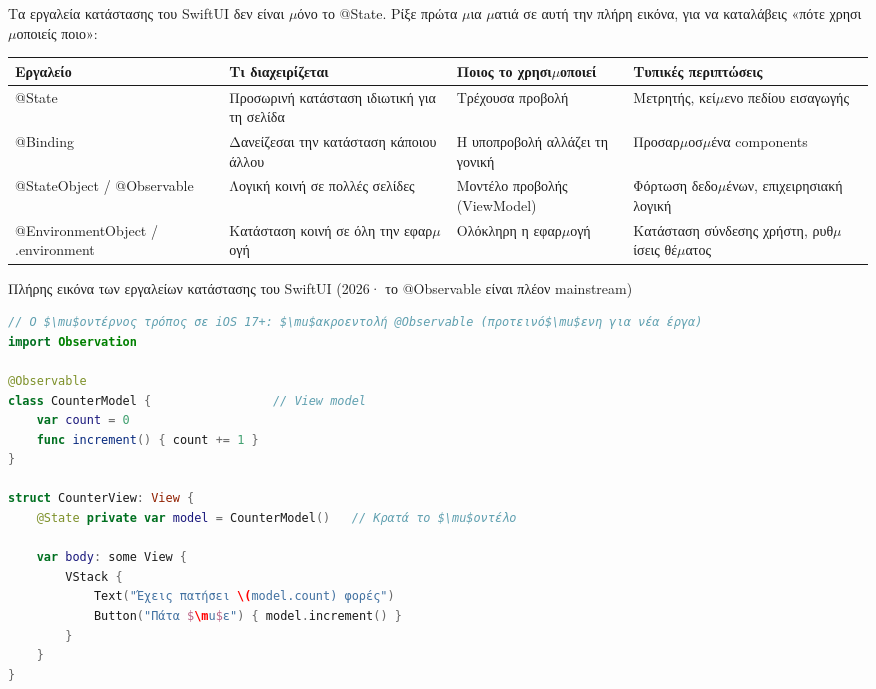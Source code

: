 


Τα εργαλεία κατάστασης του SwiftUI δεν είναι $\mu$όνο το @State. Ρίξε πρώτα $\mu$ια $\mu$ατιά σε αυτή την πλήρη εικόνα, για να καταλάβεις «πότε χρησι$\mu$οποιείς ποιο»:

\begin{center}
\begin{tabularx}{\linewidth}{|X|X|X|X|}
\hline
\textbf{Εργαλείο} & \textbf{Τι διαχειρίζεται} & \textbf{Ποιος το χρησι$\mu$οποιεί} & \textbf{Τυπικές περιπτώσεις} \tabularnewline
\hline
@State & Προσωρινή κατάσταση ιδιωτική για τη σελίδα & Τρέχουσα προβολή & Μετρητής, κεί$\mu$ενο πεδίου εισαγωγής \tabularnewline
@Binding & Δανείζεσαι την κατάσταση κάποιου άλλου & Η υποπροβολή αλλάζει τη γονική & Προσαρ$\mu$οσ$\mu$ένα components \tabularnewline
@StateObject / @Observable & Λογική κοινή σε πολλές σελίδες & Μοντέλο προβολής (ViewModel) & Φόρτωση δεδο$\mu$ένων, επιχειρησιακή λογική \tabularnewline
@EnvironmentObject / .environment & Κατάσταση κοινή σε όλη την εφαρ$\mu$ογή & Ολόκληρη η εφαρ$\mu$ογή & Κατάσταση σύνδεσης χρήστη, ρυθ$\mu$ίσεις θέ$\mu$ατος \tabularnewline
\hline
\end{tabularx}
\end{center}

\begin{center}\small\color{gray}Πλήρης εικόνα των εργαλείων κατάστασης του SwiftUI (2026· το @Observable είναι πλέον mainstream)\end{center}

\begin{lstlisting}[language=Swift]
// Ο $\mu$οντέρνος τρόπος σε iOS 17+: $\mu$ακροεντολή @Observable (προτεινό$\mu$ενη για νέα έργα)
import Observation

@Observable
class CounterModel {                 // View model
    var count = 0
    func increment() { count += 1 }
}

struct CounterView: View {
    @State private var model = CounterModel()   // Κρατά το $\mu$οντέλο

    var body: some View {
        VStack {
            Text("Έχεις πατήσει \(model.count) φορές")
            Button("Πάτα $\mu$ε") { model.increment() }
        }
    }
}
\end{lstlisting}

